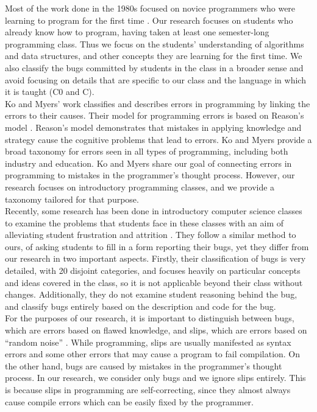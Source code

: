 \documentclass{sig-alternate}
\begin{document}
Most of the work done in the 1980s focused on novice programmers who were learning to program for the first time \cite{SpohrerSoloway86, Pea86}. Our research focuses on students who already know how to program, having taken at least one semester-long programming class. Thus we focus on the students' understanding of algorithms and data structures, and other concepts they are learning for the first time. We also classify the bugs committed by students in the class in a broader sense and avoid focusing on details that are specific to our class and the language in which it is taught (C0 and C).\\

Ko and Myers' work \cite{KoMyers03} classifies and describes errors in programming by linking the errors to their causes. Their model for programming errors is based on Reason's model \cite{Reason90}. Reason's model demonstrates that mistakes in applying knowledge and strategy cause the cognitive problems that lead to errors. Ko and Myers provide a broad taxonomy for errors seen in all types of programming, including both industry and education. Ko and Myers share our goal of connecting errors in programming to mistakes in the programmer's thought process. However, our research focuses on introductory programming classes, and we provide a taxonomy tailored for that purpose.\\

Recently, some research has been done in introductory computer science classes to examine the problems that students face in these classes with an aim of alleviating student frustration and attrition \cite{BryceCooleyHansenHayrapetyan10}. They follow a similar method to ours, of asking students to fill in a form reporting their bugs, yet they differ from our research in two important aspects. Firstly, their classification of bugs is very detailed, with 20 disjoint categories, and focuses heavily on particular concepts and ideas covered in the class, so it is not applicable beyond their class without changes. Additionally, they do not examine student reasoning behind the bug, and classify bugs entirely based on the description and code for the bug.\\

For the purposes of our research, it is important to distinguish between bugs, which are errors based on flawed knowledge, and slips, which are errors based on ``random noise'' \cite{VanLehn90}. While programming, slips are usually manifested as syntax errors and some other errors that may cause a program to fail compilation. On the other hand, bugs are caused by mistakes in the programmer's thought process. In our research, we consider only bugs and we ignore slips entirely. This is because slips in programming are self-correcting, since they almost always cause compile errors which can be easily fixed by the programmer.\\
\end{document}
